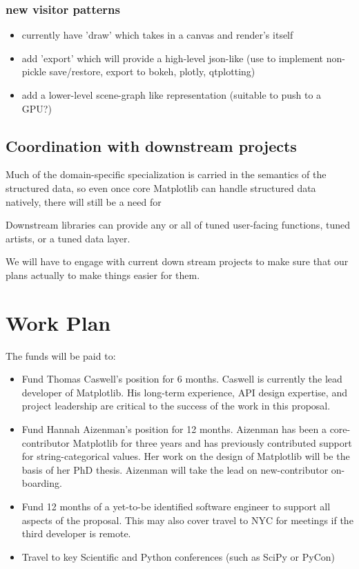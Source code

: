 \documentclass[11pt]{article}  %
\begin{document}
\subsubsection{new visitor patterns}

\begin{itemize}
\item currently have 'draw' which takes in a canvas and render's itself
\item add 'export' which will provide a high-level json-like (use to
  implement non-pickle save/restore, export to {bokeh, plotly,
    qtplotting})
\item add a lower-level scene-graph like representation (suitable to push to a GPU?)
\end{itemize}

\subsection{Coordination with downstream projects}

Much of the domain-specific specialization is carried in the semantics
of the structured data, so even once core Matplotlib can handle structured
data natively, there will still be a need for

Downstream libraries can provide any or all of tuned user-facing
functions, tuned artists, or a tuned data layer.

We will have to engage with current down stream projects to make sure
that our plans actually to make things easier for them.


\section{Work Plan}

The funds will be paid to:

\begin{itemize}

\item Fund Thomas Caswell's position for 6 months.  Caswell is
  currently the lead developer of Matplotlib.  His long-term
  experience, API design expertise, and project leadership are critical
  to the success of the work in this proposal.
\item Fund Hannah Aizenman's position for 12 months.  Aizenman has
  been a core-contributor Matplotlib for three years and has
  previously contributed support for string-categorical values.  Her
  work on the design of Matplotlib will be the basis of her PhD
  thesis.  Aizenman will take the lead on new-contributor on-boarding.
\item Fund 12 months of a yet-to-be identified software engineer to
  support all aspects of the proposal.  This may also cover travel to
  NYC for meetings if the third developer is remote.
\item Travel to key Scientific and Python conferences (such as SciPy
  or PyCon)
\end{itemize}
\end{document}
